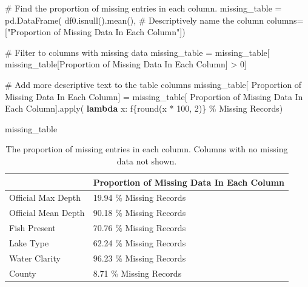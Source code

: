 \documentclass[
]{article}
\newenvironment{Shaded}{\begin{snugshade}}{\end{snugshade}}
\newcommand{\BuiltInTok}[1]{\textcolor[rgb]{0.00,0.23,0.31}{#1}}
\newcommand{\CommentTok}[1]{\textcolor[rgb]{0.37,0.37,0.37}{#1}}
\newcommand{\DecValTok}[1]{\textcolor[rgb]{0.68,0.00,0.00}{#1}}
\newcommand{\KeywordTok}[1]{\textcolor[rgb]{0.00,0.23,0.31}{\textbf{#1}}}
\newcommand{\NormalTok}[1]{\textcolor[rgb]{0.00,0.23,0.31}{#1}}
\newcommand{\OperatorTok}[1]{\textcolor[rgb]{0.37,0.37,0.37}{#1}}
\newcommand{\SpecialCharTok}[1]{\textcolor[rgb]{0.37,0.37,0.37}{#1}}
\newcommand{\SpecialStringTok}[1]{\textcolor[rgb]{0.13,0.47,0.30}{#1}}
\newcommand{\StringTok}[1]{\textcolor[rgb]{0.13,0.47,0.30}{#1}}
\begin{document}
\begin{Shaded}
\begin{Highlighting}[]
\CommentTok{\# Find the proportion of missing entries in each column.}
\NormalTok{missing\_table }\OperatorTok{=}\NormalTok{ pd.DataFrame(}
\NormalTok{    df0.isnull().mean(),}
    \CommentTok{\# Descriptively name the column}
\NormalTok{    columns}\OperatorTok{=}\NormalTok{[}\StringTok{"Proportion of Missing Data In Each Column"}\NormalTok{])}

\CommentTok{\# Filter to columns with missing data}
\NormalTok{missing\_table }\OperatorTok{=}\NormalTok{ missing\_table[}
\NormalTok{    missing\_table[}\StringTok{\textquotesingle{}Proportion of Missing Data In Each Column\textquotesingle{}}\NormalTok{] }\OperatorTok{\textgreater{}} \DecValTok{0}\NormalTok{]}

\CommentTok{\# Add more descriptive text to the table columns}
\NormalTok{missing\_table[}
\StringTok{\textquotesingle{}Proportion of Missing Data In Each Column\textquotesingle{}}\NormalTok{] }\OperatorTok{=}\NormalTok{ missing\_table[}
\StringTok{\textquotesingle{}Proportion of Missing Data In Each Column\textquotesingle{}}\NormalTok{].}\BuiltInTok{apply}\NormalTok{(}
    \KeywordTok{lambda}\NormalTok{ x: }\SpecialStringTok{f\textquotesingle{}}\SpecialCharTok{\{}\BuiltInTok{round}\NormalTok{(x }\OperatorTok{*} \DecValTok{100}\NormalTok{, }\DecValTok{2}\NormalTok{)}\SpecialCharTok{\}}\SpecialStringTok{ \% Missing Records\textquotesingle{}}\NormalTok{)}

\NormalTok{missing\_table}
\end{Highlighting}
\end{Shaded}

\begin{longtable}[]{@{}ll@{}}

\caption{\label{tbl-missing-data}The proportion of missing entries in
each column. Columns with no missing data not shown.}

\tabularnewline

\toprule\noalign{}
& Proportion of Missing Data In Each Column \\
\midrule\noalign{}
\endhead
\bottomrule\noalign{}
\endlastfoot
Official Max Depth & 19.94 \% Missing Records \\
Official Mean Depth & 90.18 \% Missing Records \\
Fish Present & 70.76 \% Missing Records \\
Lake Type & 62.24 \% Missing Records \\
Water Clarity & 96.23 \% Missing Records \\
County & 8.71 \% Missing Records \\

\end{longtable}
\end{document}

